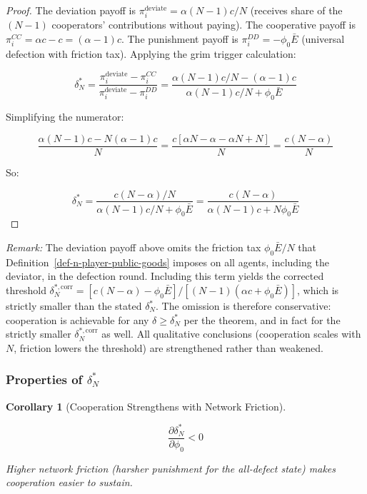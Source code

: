 \documentclass[11pt]{article}
\theoremstyle{plain}
\newtheorem{corollary}[theorem]{Corollary}
\theoremstyle{definition}
\theoremstyle{remark}
\let\origsubsubsection\subsubsection
\renewcommand{\subsubsection}{\needspace{4\baselineskip}\origsubsubsection}
\begin{document}
\begin{proof}
The deviation payoff is $\pi_i^{\text{deviate}} = \alpha(N-1)c/N$ (receives share of the $(N-1)$ cooperators' contributions without paying). The cooperative payoff is $\pi_i^{CC} = \alpha c - c = (\alpha-1)c$. The punishment payoff is $\pi_i^{DD} = -\phi_0\bar{E}$ (universal defection with friction tax). Applying the grim trigger calculation:

$$\delta_N^* = \frac{\pi_i^{\text{deviate}} - \pi_i^{CC}}{\pi_i^{\text{deviate}} - \pi_i^{DD}} = \frac{\alpha(N-1)c/N - (\alpha-1)c}{\alpha(N-1)c/N + \phi_0\bar{E}}$$

Simplifying the numerator:

$$\frac{\alpha(N-1)c - N(\alpha-1)c}{N} = \frac{c[\alpha N - \alpha - \alpha N + N]}{N} = \frac{c(N - \alpha)}{N}$$

So:

$$\delta_N^* = \frac{c(N - \alpha)/N}{\alpha(N-1)c/N + \phi_0\bar{E}} = \frac{c(N-\alpha)}{\alpha(N-1)c + N\phi_0\bar{E}}$$
\end{proof}

\emph{Remark:} The deviation payoff above omits the friction tax
\(\phi_0\bar{E}/N\) that Definition~\ref{def-n-player-public-goods}
imposes on all agents, including the deviator, in the defection round.
Including this term yields the corrected threshold
\(\delta_N^{*,\text{corr}} = [c(N-\alpha) - \phi_0\bar{E}] / [(N-1)(\alpha c + \phi_0\bar{E})]\),
which is strictly smaller than the stated \(\delta_N^*\). The omission
is therefore conservative: cooperation is achievable for any
\(\delta \geq \delta_N^*\) per the theorem, and in fact for the strictly
smaller \(\delta_N^{*,\text{corr}}\) as well. All qualitative
conclusions (cooperation scales with \(N\), friction lowers the
threshold) are strengthened rather than weakened.

\subsubsection{\texorpdfstring{Properties of
\(\delta_N^*\)}{Properties of \textbackslash delta\_N\^{}*}}\label{properties-of-delta-n-star}

\begin{corollary}[Cooperation Strengthens with Network Friction]
\label{cor-cooperation-strengthens-friction}

$$\frac{\partial \delta_N^*}{\partial \phi_0} < 0$$

Higher network friction (harsher punishment for the all-defect state) makes cooperation easier to sustain.
\end{corollary}
\end{document}
